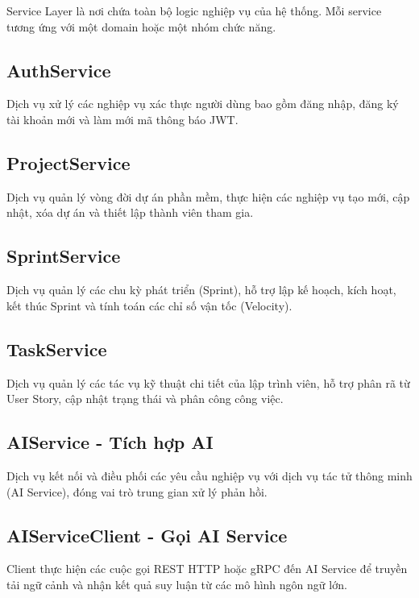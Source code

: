 \documentclass[12pt,a4paper]{report}
\begin{document}
Service Layer là nơi chứa toàn bộ logic nghiệp vụ của hệ thống. Mỗi service tương ứng với một domain hoặc một nhóm chức năng.

\subsection{AuthService}

Dịch vụ xử lý các nghiệp vụ xác thực người dùng bao gồm đăng nhập, đăng ký tài khoản mới và làm mới mã thông báo JWT.

\subsection{ProjectService}

Dịch vụ quản lý vòng đời dự án phần mềm, thực hiện các nghiệp vụ tạo mới, cập nhật, xóa dự án và thiết lập thành viên tham gia.

\subsection{SprintService}

Dịch vụ quản lý các chu kỳ phát triển (Sprint), hỗ trợ lập kế hoạch, kích hoạt, kết thúc Sprint và tính toán các chỉ số vận tốc (Velocity).

\subsection{TaskService}

Dịch vụ quản lý các tác vụ kỹ thuật chi tiết của lập trình viên, hỗ trợ phân rã từ User Story, cập nhật trạng thái và phân công công việc.

\subsection{AIService - Tích hợp AI}

Dịch vụ kết nối và điều phối các yêu cầu nghiệp vụ với dịch vụ tác tử thông minh (AI Service), đóng vai trò trung gian xử lý phản hồi.

\subsection{AIServiceClient - Gọi AI Service}

Client thực hiện các cuộc gọi REST HTTP hoặc gRPC đến AI Service để truyền tải ngữ cảnh và nhận kết quả suy luận từ các mô hình ngôn ngữ lớn.
\end{document}
